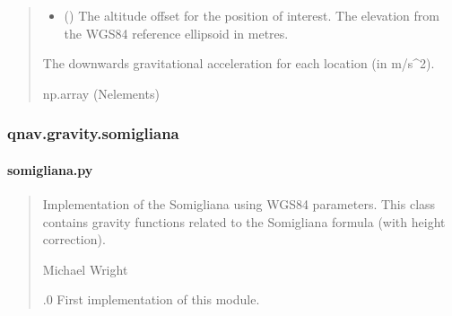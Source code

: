 \documentclass[letterpaper,10pt,english]{sphinxmanual}
\begin{document}
\begin{fulllineitems}
\begin{fulllineitems}
\begin{quote}
\begin{description}
\begin{itemize}
\item {} 
\sphinxAtStartPar
{} () \textendash{} The altitude offset for the position of interest.
The elevation from the WGS\sphinxhyphen{}84 reference ellipsoid in metres.

\end{itemize}

\sphinxAtStartPar
The downwards gravitational acceleration for each location
(in m/s\textasciicircum{}2).

\sphinxAtStartPar
np.array (N\sphinxhyphen{}elements)

\end{description}\end{quote}

\end{fulllineitems}


\end{fulllineitems}


\sphinxstepscope


\subsubsection{qnav.gravity.somigliana}
\label{\detokenize{modules/gravity/somigliana:module-qnav.gravity.somigliana}}\label{\detokenize{modules/gravity/somigliana:qnav-gravity-somigliana}}\label{\detokenize{modules/gravity/somigliana::doc}}

\paragraph{somigliana.py}
\label{\detokenize{modules/gravity/somigliana:somigliana-py}}\begin{quote}\begin{description}
\sphinxAtStartPar
Implementation of the Somigliana using WGS\sphinxhyphen{}84 parameters.
This class contains gravity functions related to the Somigliana
formula (with height correction).

\sphinxAtStartPar
Michael Wright \sphinxhyphen{} 

.0 \sphinxhyphen{} First implementation of this module.

\end{description}\end{quote}
\end{document}
